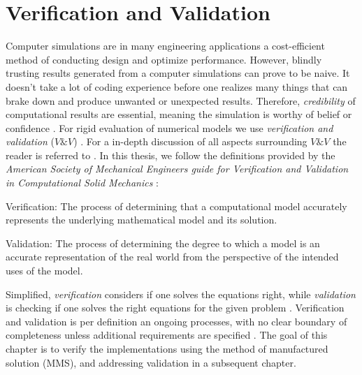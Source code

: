 \chapter{Verification and Validation}
 Computer simulations are in many engineering applications a cost-efficient method of conducting design and optimize performance. However, blindly trusting results generated from a computer simulations can prove to be naive. It doesn't take a lot of coding experience before one realizes many things that can brake down and produce unwanted or unexpected results. 
Therefore, \textit{credibility} of computational results are essential, meaning the simulation is worthy of belief or confidence \cite{Oberkampf2010}. For rigid evaluation of numerical models we use \textit{verification and validation} ($V\&V$) \cite{Sommerville2006}. For a in-depth discussion of all aspects surrounding $V\&V$ the reader is referred to \cite{Oberkampf2010}. In this thesis, we follow the definitions provided by the \textit{American Society of Mechanical Engineers guide for Verification and Validation in Computational Solid Mechanics}  \cite{Schwer2006}:
\begin{defn}
Verification: The process of determining that a computational model accurately represents
the underlying mathematical model and its solution. 
\end{defn}
\begin{defn}
Validation: The process of determining the degree to which a model is an accurate
representation of the real world from the perspective of the intended uses of the model. 
\label{eq:intcond}
\end{defn}
Simplified, \textit{verification} considers if one solves the equations right, while \textit{validation} is checking if one solves the right equations for the given problem \cite{Roache}. Verification and validation is per definition an ongoing processes, with no clear boundary of completeness unless additional requirements are specified \cite{Roache}. The goal of this chapter is to verify the implementations using the method of manufactured solution (MMS), and addressing validation in a subsequent chapter.
